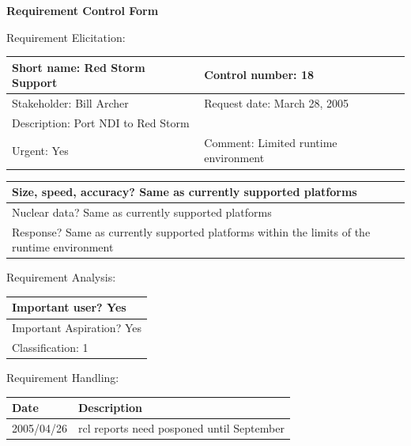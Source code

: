 \begin{center}\Large\bf
Requirement Control Form
\end{center}
\vspace{24pt}

Requirement Elicitation:

\begin{tabular}{|p{211pt}|p{211pt}|} \hline
Short name: Red Storm Support & Control number: 18\\ \hline
Stakeholder: Bill Archer & Request date: March 28, 2005\\ \hline
\multicolumn{2}{|l|}{Description: Port NDI to Red Storm } \\ \hline
Urgent: Yes & Comment: Limited runtime environment \\ \hline
\end{tabular}

\vspace{12pt}

\begin{tabular}{|p{433pt}|} \hline
Size, speed, accuracy? Same as currently supported platforms \\ \hline
Nuclear data? Same as currently supported platforms\\ \hline
Response? Same as currently supported platforms within the limits of
the runtime environment \\ \hline
\end{tabular}
\vspace{24pt}

Requirement Analysis:

\begin{tabular}{|p{433pt}|} \hline
Important user? Yes \\ \hline
Important Aspiration? Yes \\ \hline
Classification: 1 \\ \hline
\end{tabular}
\vspace{24pt}

Requirement Handling:

\begin{tabular}{|p{72pt}|p{351pt}|} \hline
Date & Description \\ \hline
2005/04/26 & rcl reports need posponed until September
\\ \hline
\end{tabular}
\vspace{24pt}
